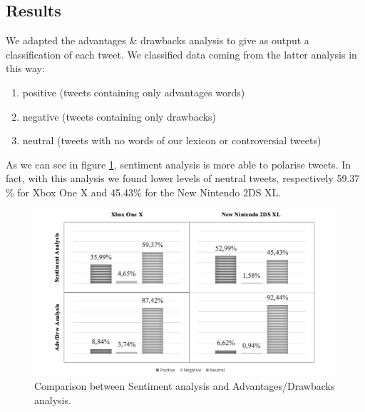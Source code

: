 \documentclass[]{book}
\providecommand{\tightlist}{%
  \setlength{\itemsep}{0pt}\setlength{\parskip}{0pt}}
\theoremstyle{definition}
\theoremstyle{definition}
\theoremstyle{definition}
\theoremstyle{remark}
\begin{document}
\subsection{Results}\label{results-9}

We adapted the advantages \& drawbacks analysis to give as output a
classification of each tweet. We classified data coming from the latter
analysis in this way:

\begin{enumerate}
\def\labelenumi{\arabic{enumi}.}
\tightlist
\item
  positive (tweets containing only advantages words)
\item
  negative (tweets containing only drawbacks)
\item
  neutral (tweets with no words of our lexicon or controversial tweets)
\end{enumerate}

As we can see in figure \ref{fig:tweetsentres}, sentiment analysis is
more able to polarise tweets. In fact, with this analysis we found lower
levels of neutral tweets, respectively 59.37 \% for Xbox One X and
45.43\% for the New Nintendo 2DS XL.

\begin{figure}

{\centering \includegraphics[width=1\linewidth]{_bookdown_files/figures/tweet_sent_res} 

}

\caption{Comparison between Sentiment analysis and Advantages/Drawbacks analysis.}\label{fig:tweetsentres}
\end{figure}
\end{document}
